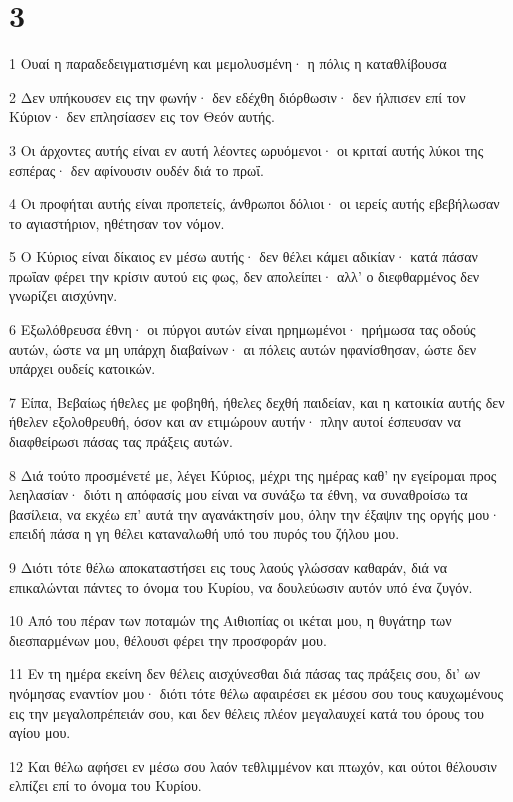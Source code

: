 \chapter{3}

\par 1 Ουαί η παραδεδειγματισμένη και μεμολυσμένη· η πόλις η καταθλίβουσα
\par 2 Δεν υπήκουσεν εις την φωνήν· δεν εδέχθη διόρθωσιν· δεν ήλπισεν επί τον Κύριον· δεν επλησίασεν εις τον Θεόν αυτής.
\par 3 Οι άρχοντες αυτής είναι εν αυτή λέοντες ωρυόμενοι· οι κριταί αυτής λύκοι της εσπέρας· δεν αφίνουσιν ουδέν διά το πρωΐ.
\par 4 Οι προφήται αυτής είναι προπετείς, άνθρωποι δόλιοι· οι ιερείς αυτής εβεβήλωσαν το αγιαστήριον, ηθέτησαν τον νόμον.
\par 5 Ο Κύριος είναι δίκαιος εν μέσω αυτής· δεν θέλει κάμει αδικίαν· κατά πάσαν πρωΐαν φέρει την κρίσιν αυτού εις φως, δεν απολείπει· αλλ' ο διεφθαρμένος δεν γνωρίζει αισχύνην.
\par 6 Εξωλόθρευσα έθνη· οι πύργοι αυτών είναι ηρημωμένοι· ηρήμωσα τας οδούς αυτών, ώστε να μη υπάρχη διαβαίνων· αι πόλεις αυτών ηφανίσθησαν, ώστε δεν υπάρχει ουδείς κατοικών.
\par 7 Είπα, Βεβαίως ήθελες με φοβηθή, ήθελες δεχθή παιδείαν, και η κατοικία αυτής δεν ήθελεν εξολοθρευθή, όσον και αν ετιμώρουν αυτήν· πλην αυτοί έσπευσαν να διαφθείρωσι πάσας τας πράξεις αυτών.
\par 8 Διά τούτο προσμένετέ με, λέγει Κύριος, μέχρι της ημέρας καθ' ην εγείρομαι προς λεηλασίαν· διότι η απόφασίς μου είναι να συνάξω τα έθνη, να συναθροίσω τα βασίλεια, να εκχέω επ' αυτά την αγανάκτησίν μου, όλην την έξαψιν της οργής μου· επειδή πάσα η γη θέλει καταναλωθή υπό του πυρός του ζήλου μου.
\par 9 Διότι τότε θέλω αποκαταστήσει εις τους λαούς γλώσσαν καθαράν, διά να επικαλώνται πάντες το όνομα του Κυρίου, να δουλεύωσιν αυτόν υπό ένα ζυγόν.
\par 10 Από του πέραν των ποταμών της Αιθιοπίας οι ικέται μου, η θυγάτηρ των διεσπαρμένων μου, θέλουσι φέρει την προσφοράν μου.
\par 11 Εν τη ημέρα εκείνη δεν θέλεις αισχύνεσθαι διά πάσας τας πράξεις σου, δι' ων ηνόμησας εναντίον μου· διότι τότε θέλω αφαιρέσει εκ μέσου σου τους καυχωμένους εις την μεγαλοπρέπειάν σου, και δεν θέλεις πλέον μεγαλαυχεί κατά του όρους του αγίου μου.
\par 12 Και θέλω αφήσει εν μέσω σου λαόν τεθλιμμένον και πτωχόν, και ούτοι θέλουσιν ελπίζει επί το όνομα του Κυρίου.

